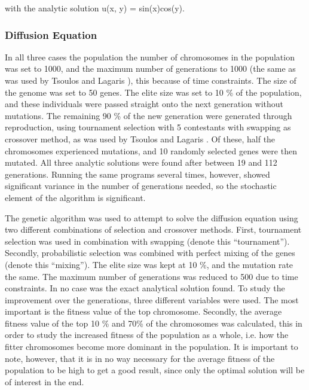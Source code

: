\documentclass[multicolumn, 10pt]{extarticle}
\begin{document}
with the analytic solution u(x, y) = sin(x)cos(y).

\subsubsection{Diffusion Equation}
In all three cases the population the number of chromosomes in the population was set to 1000, and the maximum number of generations to 1000 (the same as was used by Tsoulos and Lagaris \cite{Lagaris}), this because of time constraints. The size of the genome was set to 50 genes. The elite size was set to 10 \% of the population, and these individuals were passed straight onto the next generation without mutations. The remaining 90 \% of the new generation were generated through reproduction, using tournament selection with 5 contestants with swapping as crossover method, as was used by Tsoulos and Lagaris \cite{Lagaris}. Of these, half the chromosomes experienced mutations, and 10 randomly selected genes were then mutated. All three analytic solutions were found after between 19 and 112 generations. Running the same programs several times, however, showed significant variance in the number of generations needed, so the stochastic element of the algorithm is significant.

The genetic algorithm was used to attempt to solve the diffusion equation using two different combinations of selection and crossover methods. First, tournament selection was used in combination with swapping (denote this ``tournament''). Secondly, probabilistic selection was combined with perfect mixing of the genes (denote this ``mixing''). The elite size was kept at 10 \%, and the mutation rate the same. The maximum number of generations was reduced to 500 due to time constraints. In no case was the exact analytical solution found. To study the improvement over the generations, three different variables were used. The most important is the fitness value of the top chromosome. Secondly, the average fitness value of the top 10 \% and 70\% of the chromosomes was calculated, this in order to study the increased fitness of the population as a whole, i.e. how the fitter chromosomes become more dominant in the population. It is important to note, however, that it is in no way necessary for the average fitness of the population to be high to get a good result, since only the optimal solution will be of interest in the end.
\end{document}
